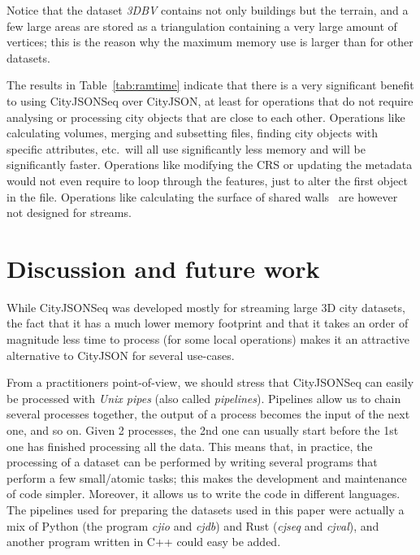 \documentclass{isprs} %
\begin{document}
Notice that the dataset \emph{3DBV} contains not only buildings but the terrain, and a few large areas are stored as a triangulation containing a very large amount of vertices; this is the reason why the maximum memory use is larger than for other datasets. 

%

The results in Table~\ref{tab:ramtime} indicate that there is a very significant benefit to using CityJSONSeq over CityJSON, at least for operations that do not require analysing or processing city objects that are close to each other.
Operations like calculating volumes, merging and subsetting files, finding city objects with specific attributes, etc.\ will all use significantly less memory and will be significantly faster.
Operations like modifying the CRS or updating the metadata would not even require to loop through the features, just to alter the first object in the file.
Operations like calculating the surface of shared walls~\citep{Agugiaro22} are however not designed for streams.


%
\section{Discussion and future work}%
\label{sec:discussion}



While CityJSONSeq was developed mostly for streaming large 3D city datasets, the fact that it has a much lower memory footprint and that it takes an order of magnitude less time to process (for some local operations) makes it an attractive alternative to CityJSON for several use-cases.

%

From a practitioners point-of-view, we should stress that CityJSONSeq can easily be processed with \emph{Unix pipes} (also called \emph{pipelines}).
Pipelines allow us to chain several processes together, the output of a process becomes the input of the next one, and so on. 
Given 2 processes, the 2nd one can usually start before the 1st one has finished processing all the data.
This means that, in practice, the processing of a dataset can be performed by writing several programs that perform a few small/atomic tasks; this makes the development and maintenance of code simpler.
Moreover, it allows us to write the code in different languages. 
The pipelines used for preparing the datasets used in this paper were actually a mix of Python (the program \emph{cjio} and \emph{cjdb}) and Rust (\emph{cjseq} and \emph{cjval}), and another program written in C++ could easy be added.
\end{document}
